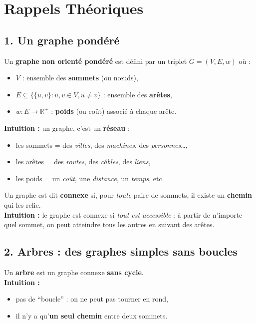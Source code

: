 
\section*{Rappels Théoriques}

\subsection*{1. Un graphe pondéré}

Un \textbf{graphe non orienté pondéré} est défini par un triplet \( G = (V, E, w) \) où :
\begin{itemize}
    \item \( V \) : ensemble des \textbf{sommets} (ou nœuds),
    \item \( E \subseteq \{ \{u,v\} : u,v \in V, u \neq v \} \) : ensemble des \textbf{arêtes},
    \item \( w : E \to \mathbb{R}^+ \) : \textbf{poids} (ou coût) associé à chaque arête.
\end{itemize}

\textbf{Intuition :} un graphe, c’est un \textbf{réseau} :
\begin{itemize}
    \item les sommets = des \emph{villes}, des \emph{machines}, des \emph{personnes}…,
    \item les arêtes = des \emph{routes}, des \emph{câbles}, des \emph{liens},
    \item les poids = un \emph{coût}, une \emph{distance}, un \emph{temps}, etc.
\end{itemize}

Un graphe est dit \textbf{connexe} si, pour \emph{toute} paire de sommets, il existe un \textbf{chemin} qui les relie. \\
\textbf{Intuition :} le graphe est connexe si \emph{tout est accessible} : à partir de n’importe quel sommet, on peut atteindre tous les autres en suivant des arêtes. 

\subsection*{2. Arbres : des graphes simples sans boucles}

Un \textbf{arbre} est un graphe connexe \textbf{sans cycle}. \\

\textbf{Intuition :}
\begin{itemize}
    \item pas de “boucle” : on ne peut pas tourner en rond,
    \item il n’y a qu’\textbf{un seul chemin} entre deux sommets.
\end{itemize}

